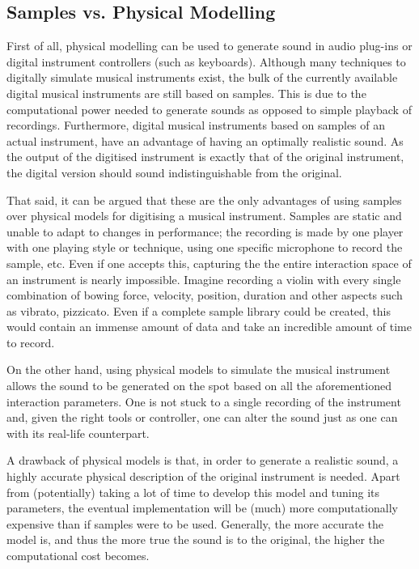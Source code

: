 \subsection{Samples vs. Physical Modelling}
First of all, physical modelling can be used to generate sound in audio plug-ins or digital instrument controllers (such as keyboards). Although many techniques to digitally simulate musical instruments exist, the bulk of the currently available digital musical instruments are still based on samples. This is due to the computational power needed to generate sounds as opposed to simple playback of recordings. Furthermore, digital musical instruments based on samples of an actual instrument, have an advantage of having an optimally realistic sound. As the output of the digitised instrument is exactly that of the original instrument, the digital version should sound indistinguishable from the original.

That said, it can be argued that these are the only advantages of using samples over physical models for digitising a musical instrument. Samples are static and unable to adapt to changes in performance; the recording is made by one player with one playing style or technique, using one specific microphone to record the sample, etc. Even if one accepts this, capturing the the entire interaction space of an instrument is nearly impossible. Imagine recording a violin with every single combination of bowing force, velocity, position, duration and other aspects such as vibrato, pizzicato. Even if a complete sample library could be created, this would contain an immense amount of data and take an incredible amount of time to record. 

On the other hand, using physical models to simulate the musical instrument allows the sound to be generated on the spot based on all the aforementioned interaction parameters. One is not stuck to a single recording of the instrument and, given the right tools or controller, one can alter the sound just as one can with its real-life counterpart.

A drawback of physical models is that, in order to generate a realistic sound, a highly accurate physical description of the original instrument is needed. Apart from (potentially) taking a lot of time to develop this model and tuning its parameters, the eventual implementation will be (much) more computationally expensive than if samples were to be used. Generally, the more accurate the model is, and thus the more true the sound is to the original, the higher the computational cost becomes. 

